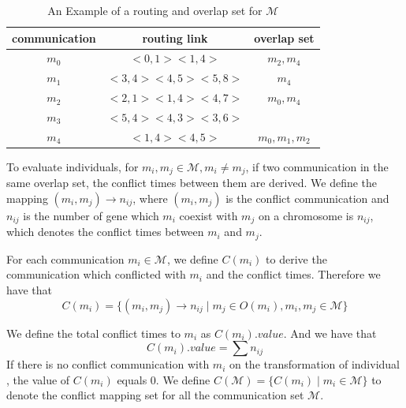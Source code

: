 \documentclass[conference]{IEEEtran}
\begin{document}
\begin{table}[!t]
	\renewcommand{\arraystretch}{1.3}
	\caption{An Example of a routing and overlap set for $\mathcal{M}$}
	\label{routing and conflict table}
	\centering
	\begin{tabular}{|c||c||c|}
		\hline
		communication & routing link & overlap set\\
		\hline
		$m_{0}$ & $ <0,1><1,4>$ 		& $m_{2},m_{4}$ \\
		\hline
		$m_{1}$ & $ <3,4><4,5><5,8>$	& $m_{4}$ \\
		\hline
		$m_{2}$ & $ <2,1><1,4><4,7>$ 	& $m_{0},m_{4}$ \\
		\hline		
		$m_{3}$ & $ <5,4><4,3><3,6>$ 	& \\
		\hline
		$m_{4}$ & $ <1,4><4,5>$ 		& $m_{0},m_{1},m_{2}$ \\
		\hline		
	\end{tabular}
\end{table}

To evaluate individuals, for $m_{i},m_{j}\in \mathcal{M}, m_{i}\neq m_{j}$, if two communication in the same overlap set, the conflict times between them are derived. We define the mapping $(m_{i},m_{j})\rightarrow n_{ij}$, where $(m_{i},m_{j})$ is the conflict communication and $n_{ij}$ is the number of gene which $m_{i}$ coexist with $m_{j}$ on a chromosome is $n_{ij}$, which denotes the conflict times between $m_{i}$ and $m_{j}$.

For each communication $m_{i}\in\mathcal{M}$, we define $C(m_{i})$ to derive the communication which conflicted with $m_{i}$ and the conflict times. Therefore we have that
\begin{equation}
	C(m_{i}) = 
\{(m_{i},m_{j})\rightarrow n_{ij}\mid m_j\in O(m_{i}),m_{i},m_{j}\in \mathcal{M}\}
\end{equation}

We define the total conflict times to $m_{i}$ as $C(m_i).value$. And we have that
\begin{equation}
	C(m_i).value=\sum n_{ij}
\end{equation}
If there is no conflict communication with $m_i$ on the transformation of individual , the value of $C(m_i)$ equals 0. We define $C(\mathcal{M}) = \{ C(m_i)\mid m_i\in\mathcal{M} \} $ to denote the conflict mapping set for all the communication set $\mathcal{M}$.
\end{document}
